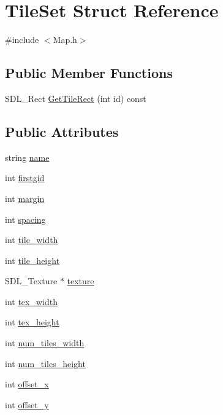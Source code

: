 \hypertarget{struct_tile_set}{}\section{Tile\+Set Struct Reference}
\label{struct_tile_set}


{\ttfamily \#include $<$Map.\+h$>$}

\subsection*{Public Member Functions}
\begin{DoxyCompactItemize}
\item 
S\+D\+L\+\_\+\+Rect \mbox{\hyperlink{struct_tile_set_acc292ea3f186e73bbd238655e50abb77}{Get\+Tile\+Rect}} (int id) const
\end{DoxyCompactItemize}
\subsection*{Public Attributes}
\begin{DoxyCompactItemize}
\item 
string \mbox{\hyperlink{struct_tile_set_abb4357754a4e050d86b4941c71f71b69}{name}}
\item 
int \mbox{\hyperlink{struct_tile_set_a452d3781af06187d71e84a147c0b67eb}{firstgid}}
\item 
int \mbox{\hyperlink{struct_tile_set_a55a34c405263221cc810131c50ad189f}{margin}}
\item 
int \mbox{\hyperlink{struct_tile_set_a2add7b9dff3d6c83df1f4a23096ea001}{spacing}}
\item 
int \mbox{\hyperlink{struct_tile_set_a5eef007cf9f62a3cf923fa487429e1fe}{tile\+\_\+width}}
\item 
int \mbox{\hyperlink{struct_tile_set_a96acf501a3a3062f112f8efb1c188f73}{tile\+\_\+height}}
\item 
S\+D\+L\+\_\+\+Texture $\ast$ \mbox{\hyperlink{struct_tile_set_aac93506fa4de016ba671fd2c326f0e87}{texture}}
\item 
int \mbox{\hyperlink{struct_tile_set_ad8e015c97882be372764235b85255429}{tex\+\_\+width}}
\item 
int \mbox{\hyperlink{struct_tile_set_acf8af81366b4c96abb65d3f5888f58c6}{tex\+\_\+height}}
\item 
int \mbox{\hyperlink{struct_tile_set_a555ee3b82742c555da117fb86134da60}{num\+\_\+tiles\+\_\+width}}
\item 
int \mbox{\hyperlink{struct_tile_set_a607027838599765c9a06334d44a22ede}{num\+\_\+tiles\+\_\+height}}
\item 
int \mbox{\hyperlink{struct_tile_set_a688a0df8cd4046d425062707a265639c}{offset\+\_\+x}}
\item 
int \mbox{\hyperlink{struct_tile_set_abbf2e469900f04082044a36cbb892ea1}{offset\+\_\+y}}
\end{DoxyCompactItemize}


